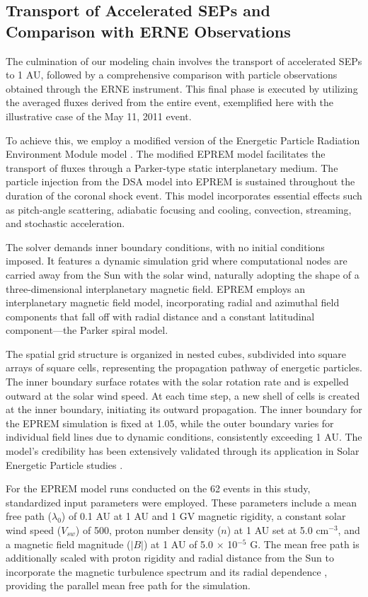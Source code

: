 \subsection{Transport of Accelerated SEPs and Comparison with ERNE Observations}
The culmination of our modeling chain involves the transport of accelerated SEPs to 1 AU, followed by a comprehensive comparison with particle observations obtained through the ERNE instrument. This final phase is executed by utilizing the averaged fluxes derived from the entire event, exemplified here with the illustrative case of the May 11, 2011 event.

To achieve this, we employ a modified version of the Energetic Particle Radiation Environment Module model \citep[EPREM]{schwadron_2010}. The modified EPREM model facilitates the transport of fluxes through a Parker-type static interplanetary medium. The particle injection from the DSA model into EPREM is sustained throughout the duration of the coronal shock event. This model incorporates essential effects such as pitch-angle scattering, adiabatic focusing and cooling, convection, streaming, and stochastic acceleration.

The solver demands inner boundary conditions, with no initial conditions imposed. It features a dynamic simulation grid where computational nodes are carried away from the Sun with the solar wind, naturally adopting the shape of a three-dimensional interplanetary magnetic field. EPREM employs an interplanetary magnetic field model, incorporating radial and azimuthal field components that fall off with radial distance and a constant latitudinal component—the Parker spiral model.

The spatial grid structure is organized in nested cubes, subdivided into square arrays of square cells, representing the propagation pathway of energetic particles. The inner boundary surface rotates with the solar rotation rate and is expelled outward at the solar wind speed. At each time step, a new shell of cells is created at the inner boundary, initiating its outward propagation. The inner boundary for the EPREM simulation is fixed at 1.05\rsun, while the outer boundary varies for individual field lines due to dynamic conditions, consistently exceeding 1 AU. The model's credibility has been extensively validated through its application in Solar Energetic Particle studies \citep{kozarev_2010, schwadron_2014}.

For the EPREM model runs conducted on the 62 events in this study, standardized input parameters were employed. These parameters include a mean free path ($\lambda_0$) of 0.1 AU at 1 AU and 1 GV magnetic rigidity, a constant solar wind speed ($V_{sw}$) of 500\kms, proton number density ($n$) at 1 AU set at 5.0 cm$^{-3}$, and a magnetic field magnitude ($|B|$) at 1 AU of 5.0 $\times$ 10$^{-5}$ G. The mean free path is additionally scaled with proton rigidity and radial distance from the Sun to incorporate the magnetic turbulence spectrum and its radial dependence \citep{zank_1998, li_2003, sokolov_2004, verkhoglyadova_2009}, providing the parallel mean free path for the simulation.

